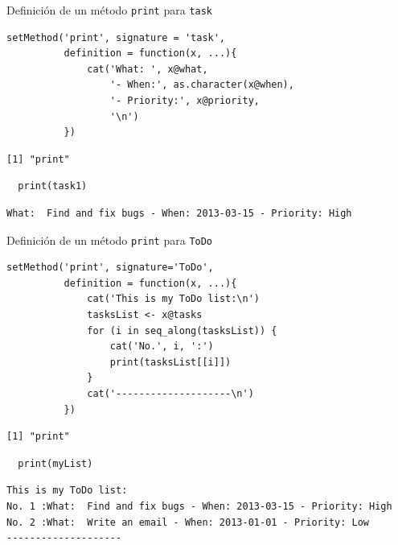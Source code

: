\documentclass[xcolor={usenames,svgnames,dvipsnames}]{beamer}
\begin{document}
\begin{frame}[fragile,label={sec:orgheadline34}]{Definición de un método \texttt{print} para \texttt{task}}
 \lstset{language=R,label= ,caption= ,captionpos=b,numbers=none}
\begin{lstlisting}
setMethod('print', signature = 'task',
          definition = function(x, ...){
              cat('What: ', x@what,
                  '- When:', as.character(x@when),
                  '- Priority:', x@priority,
                  '\n')
          })
\end{lstlisting}

\begin{verbatim}
[1] "print"
\end{verbatim}


\lstset{language=R,label= ,caption= ,captionpos=b,numbers=none}
\begin{lstlisting}
  print(task1)
\end{lstlisting}

\begin{verbatim}
What:  Find and fix bugs - When: 2013-03-15 - Priority: High
\end{verbatim}
\end{frame}

\begin{frame}[fragile,label={sec:orgheadline35}]{Definición de un método \texttt{print} para \texttt{ToDo}}
 \lstset{language=R,label= ,caption= ,captionpos=b,numbers=none}
\begin{lstlisting}
setMethod('print', signature='ToDo',
          definition = function(x, ...){
              cat('This is my ToDo list:\n')
              tasksList <- x@tasks
              for (i in seq_along(tasksList)) {
                  cat('No.', i, ':')
                  print(tasksList[[i]])
              }
              cat('--------------------\n')
          })
\end{lstlisting}

\begin{verbatim}
[1] "print"
\end{verbatim}

\lstset{language=R,label= ,caption= ,captionpos=b,numbers=none}
\begin{lstlisting}
  print(myList)
\end{lstlisting}

\begin{verbatim}
This is my ToDo list:
No. 1 :What:  Find and fix bugs - When: 2013-03-15 - Priority: High 
No. 2 :What:  Write an email - When: 2013-01-01 - Priority: Low 
--------------------
\end{verbatim}
\end{frame}
\end{document}
